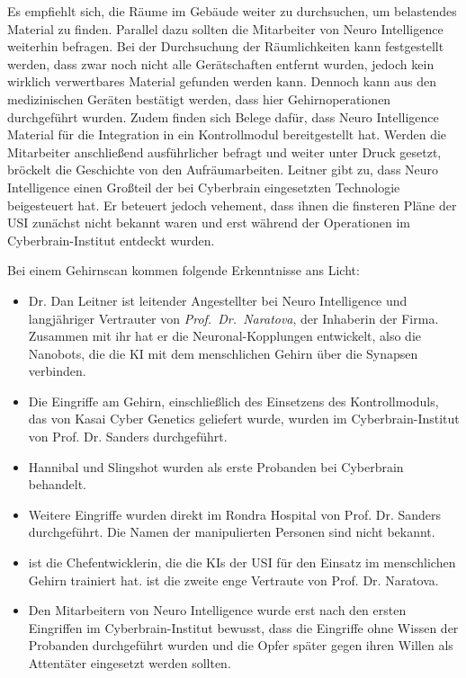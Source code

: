Es empfiehlt sich, die Räume im Gebäude weiter zu durchsuchen, um belastendes Material zu finden. Parallel dazu sollten die Mitarbeiter von Neuro Intelligence weiterhin befragen. Bei der Durchsuchung der Räumlichkeiten kann festgestellt werden, dass zwar noch nicht alle Gerätschaften entfernt wurden, jedoch kein wirklich verwertbares Material gefunden werden kann. Dennoch kann aus den medizinischen Geräten bestätigt werden, dass hier Gehirnoperationen durchgeführt wurden. Zudem finden sich Belege dafür, dass Neuro Intelligence Material für die Integration in ein Kontrollmodul bereitgestellt hat. Werden die Mitarbeiter anschließend ausführlicher befragt und weiter unter Druck gesetzt, bröckelt die Geschichte von den Aufräumarbeiten. Leitner gibt zu, dass Neuro Intelligence einen Großteil der bei Cyberbrain eingesetzten Technologie beigesteuert hat. Er beteuert jedoch vehement, dass ihnen die finsteren Pläne der USI zunächst nicht bekannt waren und erst während der Operationen im Cyberbrain-Institut entdeckt wurden.

Bei einem Gehirnscan kommen folgende Erkenntnisse ans Licht:

\begin{itemize}
	\item Dr. Dan Leitner ist leitender Angestellter bei Neuro Intelligence und langjähriger Vertrauter von \emph{Prof.~Dr.~Naratova}, der 
		Inhaberin der Firma. Zusammen mit ihr hat er die Neuronal-Kopplungen entwickelt, also die Nanobots, die die KI mit dem menschlichen Gehirn über die Synapsen verbinden.
	\item Die Eingriffe am Gehirn, einschließlich des Einsetzens des Kontrollmoduls, das von Kasai Cyber Genetics geliefert wurde, wurden 
		im Cyberbrain-Institut von Prof. Dr. Sanders durchgeführt.
	\item Hannibal und Slingshot wurden als erste Probanden bei Cyberbrain behandelt.
	\item Weitere Eingriffe wurden direkt im Rondra Hospital von Prof. Dr. Sanders durchgeführt. Die Namen der manipulierten Personen sind 
		nicht bekannt.
	\item \ml{} ist die Chefentwicklerin, die die KIs der USI für den Einsatz im menschlichen Gehirn trainiert hat. \ml{} ist die zweite 
		enge Vertraute  von Prof. Dr. Naratova.
	\item Den Mitarbeitern von Neuro Intelligence wurde erst nach den ersten Eingriffen im Cyberbrain-Institut bewusst, dass die Eingriffe 
		ohne Wissen der Probanden durchgeführt wurden und die Opfer später gegen ihren Willen als Attentäter eingesetzt werden sollten.
\end{itemize}

